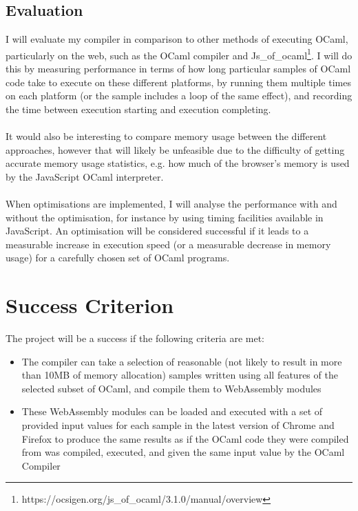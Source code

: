 \documentclass[12pt]{article}
\begin{document}
	\subsection*{Evaluation}
	I will evaluate my compiler in comparison to other methods of executing OCaml, particularly on the web, such as the OCaml compiler and Js\_of\_ocaml\footnote{https://ocsigen.org/js\_of\_ocaml/3.1.0/manual/overview}. I will do this by measuring performance in terms of how long particular samples of OCaml code take to execute on these different platforms, by running them multiple times on each platform (or the sample includes a loop of the same effect), and recording the time between execution starting and execution completing.
	\\\\
	It would also be interesting to compare memory usage between the different approaches, however that will likely be unfeasible due to the difficulty of getting accurate memory usage statistics, e.g. how much of the browser's memory is used by the JavaScript OCaml interpreter.
	\\\\
	When optimisations are implemented, I will analyse the performance with and without the optimisation, for instance by using timing facilities available in JavaScript. An optimisation will be considered successful if it leads to a measurable increase in execution speed (or a measurable decrease in memory usage) for a carefully chosen set of OCaml programs.
	
	
	\section*{Success Criterion}
	The project will be a success if the following criteria are met:
	\begin{itemize}
		\item The compiler can take a selection of reasonable (not likely to result in more than 10MB of memory allocation) samples written using all features of the selected subset of OCaml, and compile them to WebAssembly modules
		\item These WebAssembly modules can be loaded and executed with a set of provided input values for each sample in the latest version of Chrome and Firefox to produce the same results as if the OCaml code they were compiled from was compiled, executed, and given the same input value by the OCaml Compiler
	\end{itemize}
	
	
\end{document}
